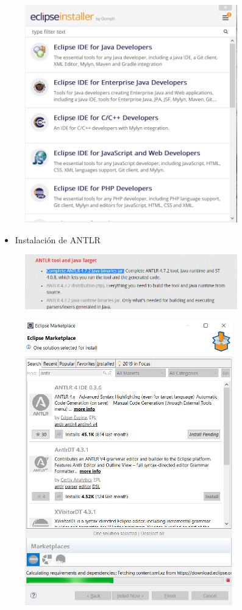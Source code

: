 \documentclass[a4paper,openright,14pt]{report}
\begin{document}
\begin{figure}[htb]
\begin{center}
\includegraphics[width=9.2cm]{imagen4}
\end{center}
\end{figure}
\newpage
\begin{itemize}
\item Instalaci\'on de ANTLR
\end{itemize}
\begin{figure}[htb]
\begin{center}
\includegraphics[width=9.2cm]{imagen5}
\end{center}
\end{figure}
\begin{figure}[htb]
\begin{center}
\includegraphics[width=9cm]{imagen6}
\end{center}
\end{figure}
\end{document}
